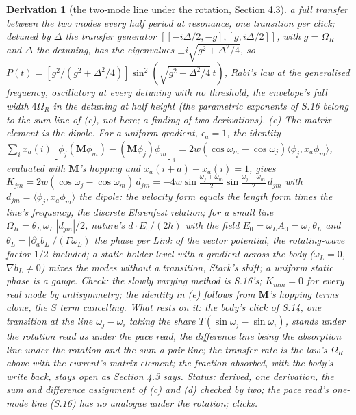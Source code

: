 \documentclass[pdflatex,sn-mathphys-num]{sn-jnl}
\theoremstyle{thmstyleone}
\newtheorem{derivation}{Derivation}
\begin{document}
\begin{derivation}[the two-mode line under the rotation, Section 4.3]
a full transfer between the two modes every half period at resonance, one transition per click; detuned by $\Delta$ the transfer generator $[[-i\Delta / 2, -g], [g, i\Delta / 2]]$, with $g = \Omega_R$ and $\Delta$ the detuning, has the eigenvalues $\pm i\sqrt{g^2 + \Delta^2 / 4}$, so $P(t) = [g^2 / (g^2 + \Delta^2 / 4)]\sin^2(\sqrt{g^2 + \Delta^2 / 4}\,t)$, Rabi's law at the generalised frequency, oscillatory at every detuning with no threshold, the envelope's full width $4\Omega_R$ in the detuning at half height (the parametric exponents of S.16 belong to the sum line of (c), not here; a finding of two derivations). (e) \emph{The matrix element is the dipole.} For a uniform gradient, $\epsilon_a = 1$, the identity $\sum_i x_a(i)[\phi_j(\mathbf M\phi_m) - (\mathbf M\phi_j)\phi_m]_i = 2w(\cos\omega_m - \cos\omega_j)\langle\phi_j, x_a\phi_m\rangle$, evaluated with $\mathbf M$'s hopping and $x_a(i+a) - x_a(i) = 1$, gives $K_{jm} = 2w(\cos\omega_j - \cos\omega_m)\,d_{jm} = -4w\sin\tfrac{\omega_j + \omega_m}{2}\sin\tfrac{\omega_j - \omega_m}{2}\,d_{jm}$ with $d_{jm} = \langle\phi_j, x_a\phi_m\rangle$ the dipole: the velocity form equals the length form times the line's frequency, the discrete Ehrenfest relation; for a small line $\Omega_R = \theta_L\,\omega_L\,|d_{jm}| / 2$, nature's $d\cdot E_0 / (2\hbar)$ with the field $E_0 = \omega_L A_0 = \omega_L\theta_L$ and $\theta_L = |\partial_a b_L| / (\Gamma\omega_L)$ the phase per Link of the vector potential, the rotating-wave factor $1 / 2$ included; a static holder level with a gradient across the body ($\omega_L = 0$, $\nabla b_L \ne 0$) mixes the modes without a transition, Stark's shift; a uniform static phase is a gauge. \emph{Check:} the slowly varying method is S.16's; $K_{mm} = 0$ for every real mode by antisymmetry; the identity in (e) follows from $\mathbf M$'s hopping terms alone, the $S$ term cancelling. \emph{What rests on it:} the body's click of S.14, one transition at the line $\omega_j - \omega_i$ taking the share $T(\sin\omega_j - \sin\omega_i)$, stands under the rotation read as under the pace read, the difference line being the absorption line under the rotation and the sum a pair line; the transfer rate is the law's $\Omega_R$ above with the current's matrix element; the fraction absorbed, with the body's write back, stays open as Section 4.3 says. \emph{Status:} derived, one derivation, the sum and difference assignment of (c) and (d) checked by two; the pace read's one-mode line (S.16) has no analogue under the rotation; clicks.
\end{derivation}
\end{document}
